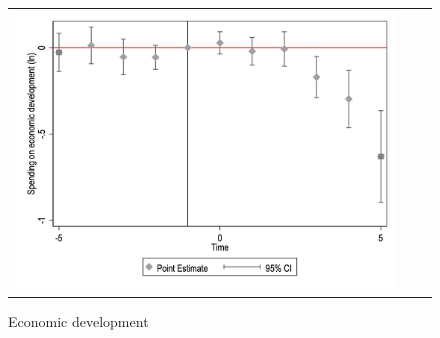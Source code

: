 \begin{figure}[!ht]
\begin{tabular}{@{}ccc@{}}
\begin{minipage}[t]{0.32\textwidth}
            \caption{Economic development}
            \includegraphics[width=\linewidth]{images/pop_100000/caseventdd_ln_q4_11_step1.jpg}
            \label{fig:casecodev}
        \end{minipage} \\[10pt]


\end{tabular}
\end{figure}
